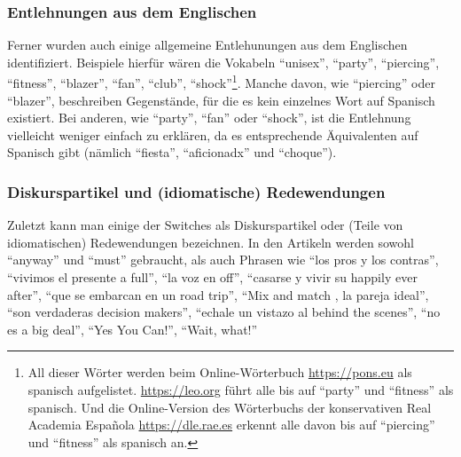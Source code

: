 \subsubsection{Entlehnungen aus dem Englischen}
Ferner wurden auch einige allgemeine Entlehunungen aus dem Englischen identifiziert.
Beispiele hierfür wären die Vokabeln ``unisex'', ``party'', ``piercing'', ``fitness'', ``blazer'', ``fan'', ``club'', ``shock''\footnote{All dieser Wörter werden beim Online-Wörterbuch \url{https://pons.eu} als spanisch aufgelistet. \url{https://leo.org} führt alle bis auf ``party'' und ``fitness'' als spanisch. Und die Online-Version des Wörterbuchs der konservativen Real Academia Española \url{https://dle.rae.es} erkennt alle davon bis auf ``piercing'' und ``fitness'' als spanisch an.}.
Manche davon, wie ``piercing'' oder ``blazer'', beschreiben Gegenstände, für die es kein einzelnes Wort auf Spanisch existiert.
Bei anderen, wie ``party'', ``fan'' oder ``shock'',  ist die Entlehnung vielleicht weniger einfach zu erklären, da es entsprechende Äquivalenten auf Spanisch gibt (nämlich ``fiesta'', ``aficionadx'' und ``choque''). %

\subsubsection{Diskurspartikel und (idiomatische) Redewendungen}
Zuletzt kann man einige der Switches als Diskurspartikel oder (Teile von idiomatischen) Redewendungen bezeichnen.
In den Artikeln werden sowohl ``anyway'' und ``must'' gebraucht, als auch Phrasen wie ``los pros y los contras'', ``vivimos el presente a full'', ``la voz en off'', ``casarse y vivir su happily ever after'', ``que se embarcan en un road trip'', ``Mix and match , la pareja ideal'', ``son verdaderas decision makers'', ``echale un vistazo al behind the scenes'', ``no es a big deal'', ``Yes You Can!'', ``Wait, what!''

\begin{comment}
\begin{enumerate}
  \item English interjections as part of the Spanish text:
      ``me di quenta que wow!'', ``pense wow esto es lo que quiro''
  \item Whole phrases in English, not necessarily idiomatic %
  \item Misc: one English word without category at the moment
  \item Cool/slang/hip/life-style
      ``cool''
  \item Personal descriptions
      needy, creepy, charming
  \item Berufe/Stellenbezeichnungen: ``nanny'', ``babysitter'', ``dog walker'', ``coach de lifestyle''
  \item Electrodomestics
      ``juicer'' (in Klammern, next to the spanisch text), ``microwave''
\end{enumerate}
\end{comment}

